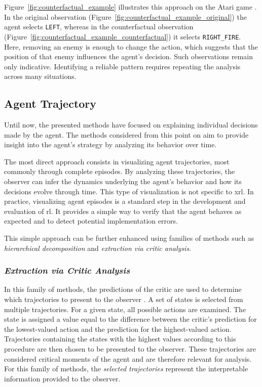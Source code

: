 Figure~\ref{fig:counterfactual_example} illustrates this approach on the Atari game \textit{\SpaceInvadersName} \parencite{olson2021counterfactual}.
In the original observation (Figure~\ref{fig:counterfactual_example_original}) the agent selects \texttt{LEFT}, whereas in the counterfactual observation (Figure~\ref{fig:counterfactual_example_counterfactual}) it selects \texttt{RIGHT\_FIRE}.
Here, removing an enemy is enough to change the action, which suggests that the position of that enemy influences the agent's decision.
Such observations remain only indicative. Identifying a reliable pattern requires repeating the analysis across many situations.



\subsection{Agent Trajectory}
\label{subsec:agent_trajectory}

Until now, the presented methods have focused on explaining individual decisions made by the agent.
The methods considered from this point on aim to provide insight into the agent's strategy by analyzing its behavior over time.

The most direct approach consists in visualizing agent trajectories, most commonly through complete episodes.
By analyzing these trajectories, the observer can infer the dynamics underlying the agent's behavior and how its decisions evolve through time.
This type of visualization is not specific to \gls{xrl}.
In practice, visualizing agent episodes is a standard step in the development and evaluation of \gls{rl}.
It provides a simple way to verify that the agent behaves as expected and to detect potential implementation errors.

This simple approach can be further enhanced using families of methods such as \textit{hierarchical decomposition} and \textit{extraction via critic analysis}.

\subsubsection{\textit{Extraction via Critic Analysis}}
\label{subsubsec:extraction_via_critic_analysis}

In this family of methods, the predictions of the critic are used to determine which trajectories to present to the observer \parencite{Sequeira_2020}.
A set of states is selected from multiple trajectories.
For a given state, all possible actions are examined.
The state is assigned a value equal to the difference between the critic's prediction for the lowest-valued action and the prediction for the highest-valued action.
Trajectories containing the states with the highest values according to this procedure are then chosen to be presented to the observer.
These trajectories are considered critical moments of the agent and are therefore relevant for analysis.
For this family of methods, the \textit{selected trajectories} represent the interpretable information provided to the observer.

